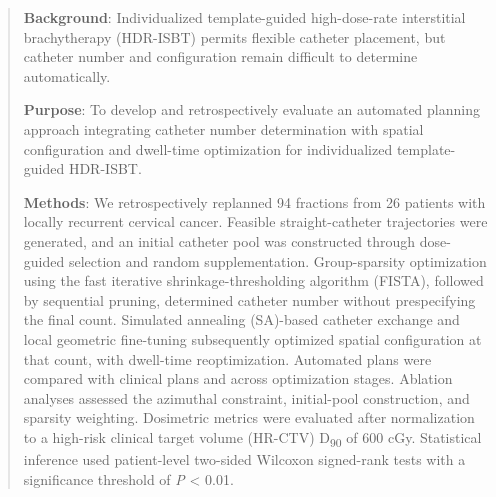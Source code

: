 \documentclass[12pt,twoside,letterpaper]{article}
\newcounter{algorithm}
\begin{document}
\begin{abstract}

\noindent \textbf{Background}: Individualized template-guided high-dose-rate interstitial brachytherapy (HDR-ISBT) permits flexible catheter placement, but catheter number and configuration remain difficult to determine automatically.\par

\noindent \textbf{Purpose}: To develop and retrospectively evaluate an automated planning approach integrating catheter number determination with spatial configuration and dwell-time optimization for individualized template-guided HDR-ISBT.\par

\noindent \textbf{Methods}: We retrospectively replanned 94 fractions from 26 patients with locally recurrent cervical cancer. Feasible straight-catheter trajectories were generated, and an initial catheter pool was constructed through dose-guided selection and random supplementation. Group-sparsity optimization using the fast iterative shrinkage-thresholding algorithm (FISTA), followed by sequential pruning, determined catheter number without prespecifying the final count. Simulated annealing (SA)-based catheter exchange and local geometric fine-tuning subsequently optimized spatial configuration at that count, with dwell-time reoptimization. Automated plans were compared with clinical plans and across optimization stages. Ablation analyses assessed the azimuthal constraint, initial-pool construction, and sparsity weighting. Dosimetric metrics were evaluated after normalization to a high-risk clinical target volume (HR-CTV) D\textsubscript{90} of 600 cGy. Statistical inference used patient-level two-sided Wilcoxon signed-rank tests with a significance threshold of \emph{P} < 0.01.\par


\end{abstract}
\end{document}
